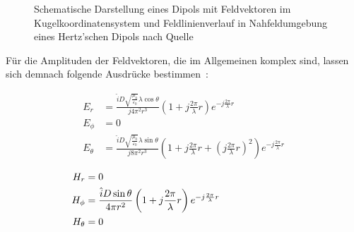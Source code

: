 \begin{figure}
\begin{subfigure}[c]{0.3\textheight}
        \caption{\label{subfig:2_Feldverlauf_Hertz-Dipol}}
    \end{subfigure}
    \caption[Schematische Darstellung eines Dipols und Nahfeldumgebung eines Hertz'schen Dipols nach Quelle~\cite{EMV}]{Schematische Darstellung eines Dipols mit Feldvektoren im Kugelkoordinatensystem und Feldlinienverlauf in Nahfeldumgebung eines Hertz'schen Dipols nach Quelle~\cite{EMV}}
    \label{fig:2_Feldverlauf}
\end{figure}

Für die Amplituden der Feldvektoren, die im Allgemeinen komplex sind, lassen sich demnach folgende Ausdrücke bestimmen~\cite{Antenna_Theory, EMV}:

\begin{subequations}
\label{eq:2_elektrische_Feldvektoren}
    \begin{align}
        E_r &= \frac{\hat i D \sqrt{\frac{\mu_0}{\varepsilon_0}} \lambda \cos{\theta}}{j 4 \pi^2 r^3}\left(1+ j\frac{2\pi}{\lambda}r\right)e^{-j\frac{2\pi}{\lambda}r} \label{subeq:2_E-Feld1} \\
        E_{\phi} &= 0 \label{subeq:2_E-Feld2} \\
        E_{\theta} &= \frac{\hat i D \sqrt{\frac{\mu_0}{\varepsilon_0}} \lambda \sin{\theta}}{j 8 \pi^2 r^3}\left(1+ j\frac{2\pi}{\lambda}r + \left(j\frac{2\pi}{\lambda}r\right)^2\right)e^{-j\frac{2\pi}{\lambda}r} \label{subeq:2_E-Feld3}
    \end{align}
\end{subequations}

\begin{subequations}
\label{eq:2_magnetische_Feldvektoren}
    \begin{align}
        H_r &= 0 \hphantom{\text{DiesIstEinLangesPlatzhalterwort1111111111}} \label{subeq:2_H-Feld1}\\
        H_{\phi} &= \frac{\hat i D \sin{\theta}}{4 \pi r^2}\left(1+j\frac{2\pi}{\lambda}r\right)e^{-j\frac{2\pi}{\lambda}r} \label{subeq:2_H-Feld2}\\
        H_{\theta} &= 0
    \end{align}
\end{subequations}

